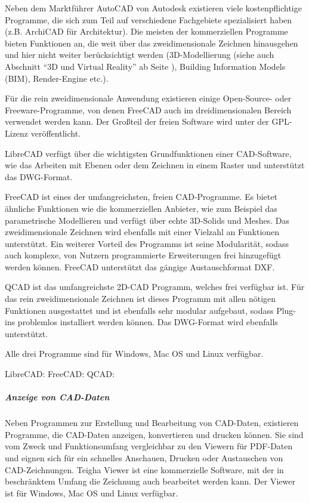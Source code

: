Neben dem Marktführer AutoCAD von Autodesk existieren viele kostenpflichtige Programme, die sich zum Teil auf verschiedene Fachgebiete spezialisiert haben (z.B. ArchiCAD für Architektur). Die meisten der kommerziellen Programme bieten Funktionen an, die weit über das zweidimensionale Zeichnen hinausgehen und hier nicht weiter berücksichtigt werden (3D-Modellierung (siehe auch Abschnitt "`3D und Virtual Reality"' ab Seite \pageref{3D}), Building Information Models (BIM), Render-Engine etc.).

Für die rein zweidimensionale Anwendung existieren einige Open-Source- oder Freeware-Programme, von denen FreeCAD auch im dreidimensionalen Bereich verwendet werden kann. Der Großteil der freien Software wird unter der GPL-Lizenz veröffentlicht. 

LibreCAD verfügt über die wichtigsten Grundfunktionen einer CAD-Software, wie das Arbeiten mit Ebenen oder dem Zeichnen in einem Raster und unterstützt das DWG-Format. 

FreeCAD ist eines der umfangreichsten, freien CAD-Programme. Es bietet ähnliche Funktionen wie die kommerziellen Anbieter, wie zum Beispiel das parametrische Modellieren und verfügt über echte 3D-Solids und Meshes. Das zweidimensionale Zeichnen wird ebenfalls mit einer Vielzahl an Funktionen unterstützt. Ein weiterer Vorteil des Programms ist seine Modularität, sodass auch komplexe, von Nutzern programmierte Erweiterungen frei hinzugefügt werden können. FreeCAD unterstützt das gängige Austauschformat DXF. 

QCAD ist das umfangreichste 2D-CAD Programm, welches frei verfügbar ist. Für das rein zweidimensionale Zeichnen ist dieses Programm mit allen nötigen Funktionen ausgestattet und ist ebenfalls sehr modular aufgebaut, sodass Plug-ins problemlos installiert werden können. Das DWG-Format wird ebenfalls unterstützt. 

Alle drei Programme sind für Windows, Mac OS und Linux verfügbar.

\begin{flushleft}
	LibreCAD: 
	FreeCAD: 
	QCAD: 
\end{flushleft}


\subparagraph{Anzeige von CAD-Daten}
Neben Programmen zur Erstellung und Bearbeitung von CAD-Daten, existieren Programme, die CAD-Daten anzeigen, konvertieren und drucken können. Sie sind vom Zweck und Funktionsumfang vergleichbar zu den Viewern für PDF-Daten und eignen sich für ein schnelles Anschauen, Drucken oder Austauschen von CAD-Zeichnungen. Teigha Viewer ist eine kommerzielle Software, mit der in beschränktem Umfang die Zeichnung auch bearbeitet werden kann. Der Viewer ist für Windows, Mac OS und Linux verfügbar. 


